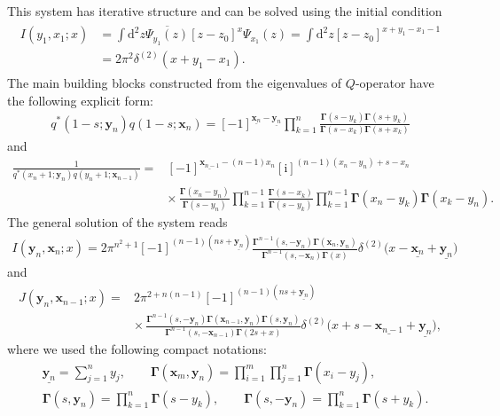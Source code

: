 \documentclass[pdftex]{sigma}
\renewcommand{\imath}{\mathrm{i}}
\numberwithin{equation}{section}
\begin{document}
This system has iterative structure and can be solved using the initial condition
\begin{align*}
\begin{split}
I(y_1,x_{1};x) & =
\int \mathrm{d}^{2} z
\overline{\Psi_{y_1}(z)}
[z-z_0]^{x} \Psi_{x_{1}}(z) =
\int \mathrm{d}^{2} z
[z-z_0]^{x+y_1-x_1 -1} \\
& = 2\pi^2\delta^{(2)}(x+y_1-x_1).
\end{split}
\end{align*}
The main building blocks constructed from the eigenvalues of $Q$-operator
have the following explicit form:
\begin{align*}
q^{*}(1-s;\bm{y}_{n}) q(1-s;\bm{x}_{n}) =
[-1]^{\underline{\bm{x}_{n}}-\underline{\bm{y}_{n}}}
\prod_{k=1}^{n}\frac{\mathbf{\Gamma}(s - y_k)\mathbf{\Gamma}(s + y_k)}{\mathbf{\Gamma}(s - x_k)\mathbf{\Gamma}(s + x_k)}
\end{align*}
and
\begin{align*}
\frac{1}{q^{*}(x_n+1;\bm{y}_{n}) q(y_n+1;\bm{x}_{n-1})} ={}&
[-1]^{\underline{\bm{x}_{n-1}}-(n-1)x_n}
[\imath]^{(n-1)(x_n-y_n)+s-x_n} \\
& {\times}\,
\frac{\mathbf{\Gamma}(x_n-y_n)}{\mathbf{\Gamma}(s-y_n)}
\prod_{k=1}^{n-1}\frac{\mathbf{\Gamma}(s -x_k)}{\mathbf{\Gamma}(s -y_k)}
\prod_{k=1}^{n-1}\mathbf{\Gamma}(x_n-y_k) \mathbf{\Gamma}(x_k-y_n) .
\end{align*}
The general solution of the system reads
\begin{align*}
I(\bm{y}_n,\bm{x}_{n};x) = 2\pi^{n^2+1} [-1]^{(n-1)(ns+\underline{\bm{y}_n})} \frac{\mathbf{\Gamma}^{n-1}(s ,-\bm{y}_n) \mathbf{\Gamma}(\bm{x}_n,\bm{y}_n)}
{\mathbf{\Gamma}^{n-1}(s ,-\bm{x}_n) \mathbf{\Gamma}(x)}
 \delta^{(2)}\bigl(x-\underline{\bm{x}_n}+\underline{\bm{y}_n}\bigr)
\end{align*}
and
\begin{align}
\nonumber
J(\bm{y}_n,\bm{x}_{n-1};x) ={}&
2\pi^{2+n(n-1)}[-1]^{(n-1)(ns+\underline{\bm{y}_n})} \\
& \label{Jn2}
{\times}\,
\frac{\mathbf{\Gamma}^{n-1}(s ,-\bm{y}_n) \mathbf{\Gamma}(\bm{x}_{n-1},\bm{y}_n)
\mathbf{\Gamma}(s ,\bm{y}_n)}
{\mathbf{\Gamma}^{n-1}(s ,-\bm{x}_{n-1}) \mathbf{\Gamma}(2s+x)}
 \delta^{(2)}\bigl(x+s-\underline{\bm{x}_{n-1}}+\underline{\bm{y}_n}\bigr) ,
\end{align}
where we used the following compact notations:
\begin{align*}
	&
	\underline{\bm{y}_n} = \sum\limits_{j=1}^n y_j ,\qquad
	\mathbf{\Gamma}(\bm{x}_{m},\bm{y}_n) =
	\prod\limits_{i=1}^{m}\prod\limits_{j=1}^n\mathbf{\Gamma}(x_i-y_j) , \\
	&
	\mathbf{\Gamma}(s ,\bm{y}_n) = \prod\limits_{k=1}^n\mathbf{\Gamma}(s - y_k) ,\qquad \mathbf{\Gamma}(s ,-\bm{y}_n) = \prod\limits_{k=1}^n\mathbf{\Gamma}(s + y_k) .
\end{align*}
\end{document}

